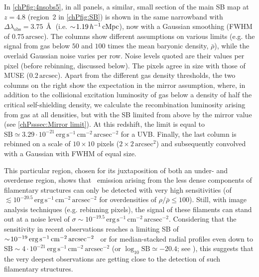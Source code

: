 In \cref{chPfig:4nsobs5}, in all panels, a similar, small section of the main SB map at $z=4.8$ (region~2 in \cref{chPfig:SB}) is shown in the same narrowband with $\Delta \lambda_\text{obs} = 3.75 \, \Angstrom$ (i.e. $\sim \! 1.19 \, h^{-1} \, \mathrm{cMpc}$), now with a Gaussian smoothing (FWHM of $0.75 \, \mathrm{arcsec}$). The columns show different assumptions on various limits (e.g. the signal from gas below $50$ and $100$ times the mean baryonic density, $\bar{\rho}$), while the overlaid Gaussian noise varies per row. Noise levels quoted are their values per pixel (before rebinning, discussed below). The pixels agree in size with those of MUSE ($0.2 \, \mathrm{arcsec}$). Apart from the different gas density thresholds, the two columns on the right show the expectation in the mirror assumption, where, in addition to the collisional excitation luminosity of gas below a density of half the critical self-shielding density, we calculate the recombination luminosity arising from gas at all densities, but with the SB limited from above by the mirror value (see \cref{chPsssec:Mirror limit}). At this redshift, the limit is equal to $\text{SB} \simeq 3.29 \cdot 10^{-21} \, \mathrm{erg \, s^{-1} \, cm^{-2} \, arcsec^{-2}}$ for a  UVB. Finally, the last column is rebinned on a scale of $10 \times 10$ pixels ($2 \times 2 \, \mathrm{arcsec}^2$) and subsequently convolved with a Gaussian with FWHM of equal size.

This particular region, chosen for its juxtaposition of both an under- and overdense region, shows that \lya\ emission arising from the less dense components of filamentary structures can only be detected with very high sensitivities (of $\lesssim 10^{-20.5} \, \mathrm{erg \, s^{-1} \, cm^{-2} \, arcsec^{-2}}$ for overdensities of $\rho/\bar{\rho} \leq 100$). Still, with image analysis techniques (e.g. rebinning pixels), the signal of these filaments can stand out at a noise level of $\sigma \sim 10^{-19.5} \, \mathrm{erg \, s^{-1} \, cm^{-2} \, arcsec^{-2}}$. Considering that the sensitivity in recent observations reaches a limiting SB of $\sim \! 10^{-19} \, \mathrm{erg \, s^{-1} \, cm^{-2} \, arcsec^{-2}}$~\cite[e.g.][]{2015A&A...575A..75B, 2017A&A...608A...1B, 2021A&A...647A.107B} or for median-stacked radial profiles even down to $\text{SB} \sim 4 \cdot 10^{-21} \, \mathrm{erg \, s^{-1} \, cm^{-2} \, arcsec^{-2}}$ (or $\log_{10}{\text{SB}} \simeq -20.4$; see \citealt{2018Natur.562..229W}), this suggests that the very deepest observations are getting close to the detection of such filamentary structures.

